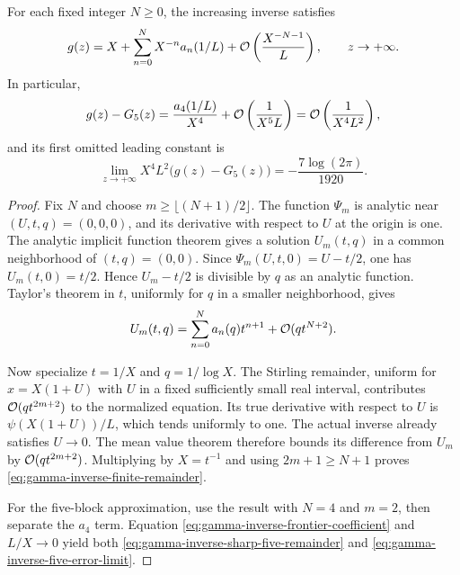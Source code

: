 \begin{theorem}
\label{thm:gamma-inverse-finite-order}
For each fixed integer $N\ge0$, the increasing inverse satisfies
\begin{equation}
 g(z)=X+\sum_{n=0}^{N}X^{-n}a_n(1/L)
           +\mathcal O\left(\frac{X^{-N-1}}L\right),
 \qquad z\to+\infty.
 \label{eq:gamma-inverse-finite-remainder}
\end{equation}
In particular,
\begin{equation}
 g(z)-G_5(z)=\frac{a_4(1/L)}{X^4}
          +\mathcal O\left(\frac1{X^5L}\right)
          =\mathcal O\left(\frac1{X^4L^2}\right),
 \label{eq:gamma-inverse-sharp-five-remainder}
\end{equation}
and its first omitted leading constant is
\begin{equation}
 \lim_{z\to+\infty}X^4L^2\bigl(g(z)-G_5(z)\bigr)
       =-\frac{7\log(2\pi)}{1920}.
 \label{eq:gamma-inverse-five-error-limit}
\end{equation}
\end{theorem}
\begin{proof}
Fix $N$ and choose $m\ge\lfloor(N+1)/2\rfloor$. The function
$\Psi_m$ is analytic near $(U,t,q)=(0,0,0)$, and its derivative with
respect to $U$ at the origin is one. The analytic implicit function
theorem gives a solution $U_m(t,q)$ in a common neighborhood of
$(t,q)=(0,0)$. Since $\Psi_m(U,t,0)=U-t/2$, one has
$U_m(t,0)=t/2$. Hence $U_m-t/2$ is divisible by $q$ as an analytic
function. Taylor's theorem in $t$, uniformly for $q$ in a smaller
neighborhood, gives
\[
 U_m(t,q)=\sum_{n=0}^{N}a_n(q)t^{n+1}
                     +\mathcal O(qt^{N+2}).
\]

Now specialize $t=1/X$ and $q=1/\log X$. The Stirling remainder,
uniform for $x=X(1+U)$ with $U$ in a fixed sufficiently small real
interval, contributes $\mathcal O(qt^{2m+2})$ to the normalized equation.
Its true derivative with respect to $U$ is $\psi(X(1+U))/L$,
which tends uniformly to one. The actual inverse already satisfies
$U\to0$. The mean value theorem therefore bounds its difference from
$U_m$ by $\mathcal O(qt^{2m+2})$. Multiplying by $X=t^{-1}$ and using
$2m+1\ge N+1$ proves \eqref{eq:gamma-inverse-finite-remainder}.

For the five-block approximation, use the result with $N=4$ and
$m=2$, then separate the $a_4$ term. Equation
\eqref{eq:gamma-inverse-frontier-coefficient} and $L/X\to0$ yield
both \eqref{eq:gamma-inverse-sharp-five-remainder} and
\eqref{eq:gamma-inverse-five-error-limit}.
\end{proof}

